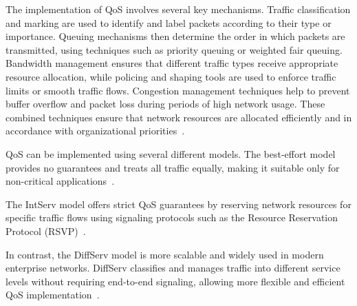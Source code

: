 The implementation of QoS involves several key mechanisms. Traffic classification and marking are used to identify and label packets according to their type or importance. Queuing mechanisms then determine the order in which packets are transmitted, using techniques such as priority queuing or weighted fair queuing. Bandwidth management ensures that different traffic types receive appropriate resource allocation, while policing and shaping tools are used to enforce traffic limits or smooth traffic flows. Congestion management techniques help to prevent buffer overflow and packet loss during periods of high network usage. These combined techniques ensure that network resources are allocated efficiently and in accordance with organizational priorities~\cite{paloalto_networks_what_nodate, hpe_juniper_networking_what_nodate, rhim_what_2024}.


QoS can be implemented using several different models. The best-effort model provides no guarantees and treats all traffic equally, making it suitable only for non-critical applications~\cite{bruno_wan_2024}.

The \ac{IntServ} model offers strict QoS guarantees by reserving network resources for specific traffic flows using signaling protocols such as the Resource Reservation Protocol (RSVP)~\cite{networklessons_introduction_nodate}.

In contrast, the \ac{DiffServ} model is more scalable and widely used in modern enterprise networks. DiffServ classifies and manages traffic into different service levels without requiring end-to-end signaling, allowing more flexible and efficient QoS implementation~\cite{bruno_wan_2024}.
